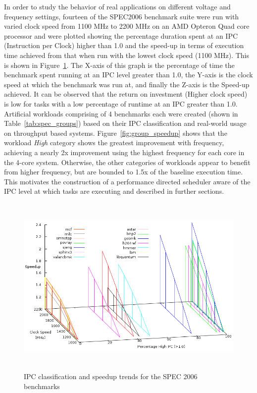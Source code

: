 In order to study the behavior of real applications on different voltage and frequency settings,
fourteen of the SPEC2006 \cite{spec:2006} benchmark suite were run with varied clock speed 
from 1100 MHz to 2200 MHz on an AMD Opteron Quad core processor and were plotted showing the 
percentage duration spent at an IPC (Instruction per Clock) higher than 1.0 and the 
speed-up in terms of execution time achieved from that when run with the lowest clock speed (1100 MHz). 
This is shown in Figure~\ref{fig:spec_classify}.
The X-axis of this graph is the percentage of time the benchmark spent running at an IPC level greater
than 1.0, the Y-axis is the clock speed at which the benchmark was run at, and finally the Z-axis 
is the Speed-up achieved. It can be observed that the return on investment (Higher clock speed)
is low for tasks with a low percentage of runtime at an IPC greater than 1.0. Artificial workloads
comprising of 4 benchmarks each were created (shown in Table~\ref{tab:spec_groups}) based on their IPC classification
and real-world usage on throughput based systems. Figure~\ref{fig:group_speedup} shows that the workload 
\textit{High} category shows the greatest improvement with frequency, achieving a nearly 2x improvement using the highest
frequency for each core in the 4-core system.  Otherwise, the other
categories of workloads appear to benefit from higher frequency, but
are bounded to 1.5x of the baseline execution time.
This motivates the construction of a performance directed scheduler aware of the IPC
level at which tasks are executing and described in further sections. 

\begin{figure}[h!]
  \begin{center}
    \includegraphics[height=3.5in]{figures/Speedup_Classify.png}%
    \caption{IPC classification and speedup trends for the SPEC 2006 benchmarks}
    \label{fig:spec_classify}
  \end{center}
\end{figure}

